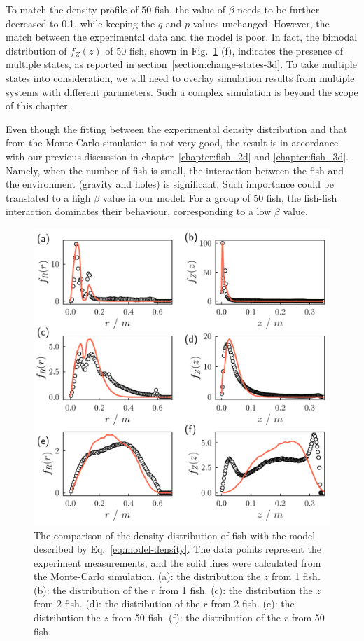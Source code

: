 \documentclass[11pt,twoside]{report}
\begin{document}
 To match the density profile of 50 fish, the value of $\beta$ needs to be further decreased to 0.1, while keeping the $q$ and $p$ values unchanged. However, the match between the experimental data and the model is poor. In fact, the bimodal distribution of $f_Z(z)$ of 50 fish, shown in Fig.~\ref{fig:model-density} (f), indicates the presence of multiple states, as reported in section~\ref{section:change-states-3d}. To take multiple states into consideration, we will need to overlay simulation results from multiple systems with different parameters. Such a complex simulation is beyond the scope of this chapter.
  
Even though the fitting between the experimental density distribution and that from the Monte-Carlo simulation is not very good, the result is in accordance with our previous discussion in chapter~\ref{chapter:fish_2d} and \ref{chapter:fish_3d}. Namely, when the number of fish is small, the interaction between the fish and the environment (gravity and holes) is significant. Such importance could be translated to a high $\beta$ value in our model. For a group of 50 fish, the fish-fish interaction dominates their behaviour, corresponding to a low $\beta$ value.


\begin{figure}
  \includegraphics[width=\linewidth]{model-density}
  \caption[Comparing the density distribution of the fish and the model]{
  The comparison of the density distribution of fish with the model described by Eq.~\ref{eq:model-density}. The data points represent the experiment measurements, and the solid lines were calculated from the Monte-Carlo simulation.
  (a): the distribution the $z$ from 1 fish.
  (b): the distribution of the $r$ from 1 fish.
  (c): the distribution the $z$ from 2 fish.
  (d): the distribution of the $r$ from 2 fish.
  (e): the distribution the $z$ from 50 fish.
  (f): the distribution of the $r$ from 50 fish.
  }
  \label{fig:model-density}
\end{figure}
\end{document}
